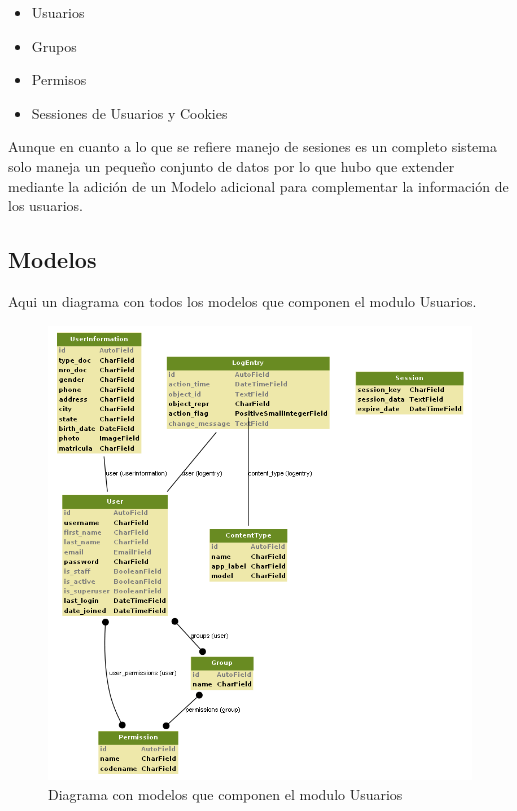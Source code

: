 \begin{itemize}
    \item Usuarios
    \item Grupos
    \item Permisos
    \item Sessiones de Usuarios y Cookies
\end{itemize}

Aunque en cuanto a lo que se refiere manejo de sesiones es un completo sistema
solo maneja un peque\~no conjunto de datos por lo que hubo que extender mediante 
la adición de un Modelo adicional para complementar la información de los 
usuarios.


\subsection{Modelos}

Aqui un diagrama con todos los modelos que componen el modulo Usuarios.

\begin{figure}[H]
    \centering
    \includegraphics[scale=0.6]{resourse/auth.png}
    \caption{Diagrama con modelos que componen el modulo Usuarios}
    \label{fig:07}
\end{figure}

